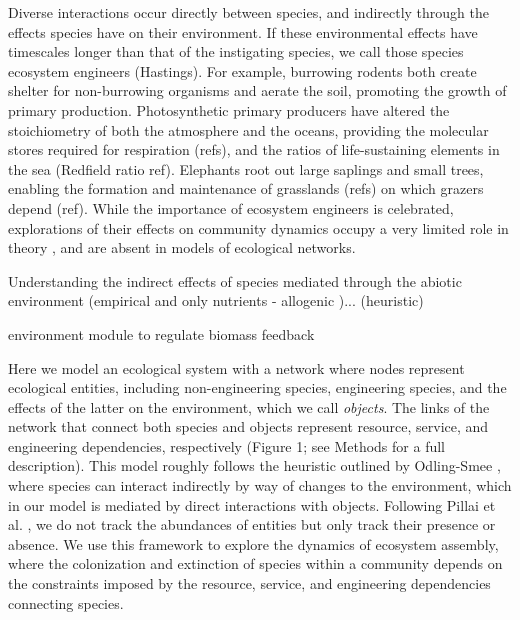 \documentclass[9pt,twocolumn,twoside]{pnas-new}
\begin{document}
Diverse interactions occur directly between species, and indirectly through the effects species have on their environment.
If these environmental effects have timescales longer than that of the instigating species, we call those species ecosystem engineers (Hastings).
For example, burrowing rodents both create shelter for non-burrowing organisms and aerate the soil, promoting the growth of primary production.
Photosynthetic primary producers have altered the stoichiometry of both the atmosphere and the oceans, providing the molecular stores required for respiration (refs), and the ratios of life-sustaining elements in the sea (Redfield ratio ref).
Elephants root out large saplings and small trees, enabling the formation and maintenance of grasslands (refs) on which grazers depend (ref).
While the importance of ecosystem engineers is celebrated, explorations of their effects on community dynamics occupy a very limited role in theory \cite{Hastings2007,OdlingSmee2013}, and are absent in models of ecological networks.

Understanding the indirect effects of species mediated through the abiotic environment \cite{Olff2009} (empirical and only nutrients - allogenic \cite{Jones1994})... \cite{OdlingSmee2013} (heuristic)

\cite{Getz2011} environment module to regulate biomass feedback


Here we model an ecological system with a network where nodes represent ecological entities, including non-engineering species, engineering species, and the effects of the latter on the environment, which we call \emph{objects}.
The links of the network that connect both species and objects represent resource, service, and engineering dependencies, respectively (Figure 1; see Methods for a full description).
This model roughly follows the heuristic outlined by Odling-Smee \cite{OdlingSmee2013}, where species can interact indirectly by way of changes to the environment, which in our model is mediated by direct interactions with objects.
Following Pillai et al. \cite{Pillai2011}, we do not track the abundances of entities but only track their presence or absence.
We use this framework to explore the dynamics of ecosystem assembly, where the colonization and extinction of species within a community depends on the constraints imposed by the resource, service, and engineering dependencies connecting species.
\end{document}
